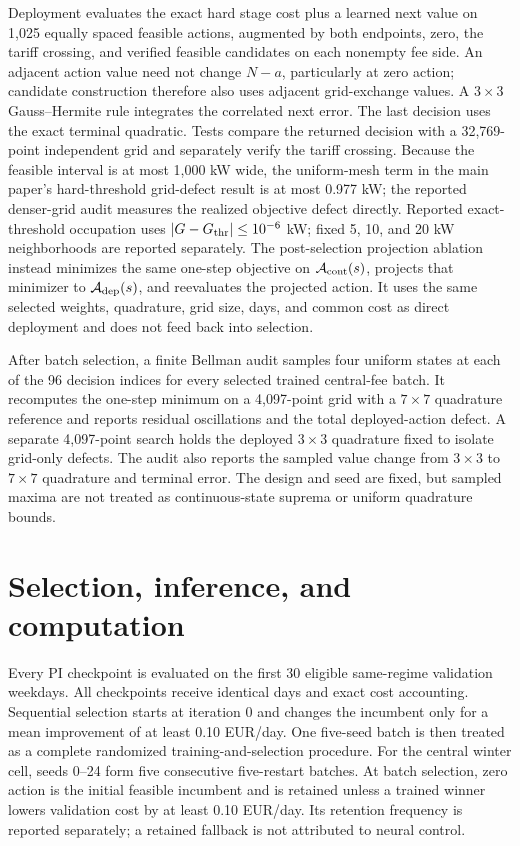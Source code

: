 \documentclass[preprint,11pt]{elsarticle}
\newcommand{\cA}{\mathcal{A}}
\begin{document}
Deployment evaluates the exact hard stage cost plus a learned next value on
1,025 equally spaced feasible actions, augmented by both endpoints, zero, the
tariff crossing, and verified feasible candidates on each nonempty fee side.
An adjacent action value need not change $N-a$, particularly at zero action;
candidate construction therefore also uses adjacent grid-exchange values.
A $3\times3$ Gauss--Hermite rule
integrates the correlated next error. The last decision uses the exact terminal
quadratic. Tests compare the returned decision with a 32,769-point independent
grid and separately verify the tariff crossing.
Because the feasible interval is at most 1,000 kW wide, the uniform-mesh term
in the main paper's hard-threshold grid-defect result is at most 0.977 kW;
the reported denser-grid audit measures the realized objective defect directly.
Reported exact-threshold occupation uses
$\lvert G-G_{\rm thr}\rvert\leq10^{-6}$ kW; fixed 5, 10, and 20 kW
neighborhoods are reported separately.
The post-selection projection ablation instead minimizes the same one-step
objective on $\cA_{\rm cont}(s)$, projects that minimizer to
$\cA_{\rm dep}(s)$, and reevaluates the projected action. It uses the same
selected weights, quadrature, grid size, days, and common cost as direct
deployment and does not feed back into selection.

After batch selection, a finite Bellman audit samples four uniform states at
each of the 96 decision indices for every selected trained central-fee batch.
It recomputes the one-step minimum on a 4,097-point grid with a $7\times7$
quadrature reference and reports residual oscillations and the total
deployed-action defect. A separate 4,097-point search holds the deployed
$3\times3$ quadrature fixed to isolate grid-only defects. The audit also
reports the sampled value change from $3\times3$ to $7\times7$ quadrature and
terminal error. The design and seed are fixed, but sampled maxima are not
treated as continuous-state suprema or uniform quadrature bounds.

\section{Selection, inference, and computation}

Every PI checkpoint is evaluated on the first 30 eligible same-regime
validation weekdays. All checkpoints receive identical days and exact cost
accounting. Sequential selection starts at iteration 0 and changes the
incumbent only for a mean improvement of at least 0.10 EUR/day. One five-seed
batch is then treated as a complete randomized training-and-selection
procedure. For the central winter cell, seeds 0--24 form five consecutive
five-restart batches. At batch selection, zero action is the initial feasible
incumbent and is retained unless a trained winner lowers validation cost by at
least 0.10 EUR/day. Its retention frequency is reported separately; a retained
fallback is not attributed to neural control.
\end{document}
